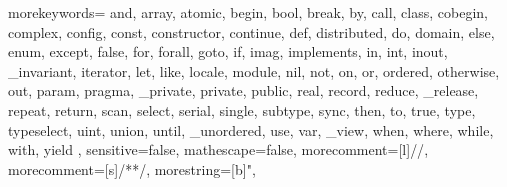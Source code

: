   {
    morekeywords={
      and, array, atomic,
      begin, bool, break, by,
      call, class, cobegin, complex, config, const, constructor, continue,
      def, distributed, do, domain,
      else, enum, except,
      false, for, forall,
      goto,
      if, imag, implements, in, int, inout, _invariant, iterator,
      let, like, locale,
      module,
      nil, not,
      on, or, ordered, otherwise, out,
      param, pragma, _private, private, public,
      real, record, reduce, _release, repeat, return,
      scan, select, serial, single, subtype, sync,
      then, to, true, type, typeselect,
      uint, union, until, _unordered, use,
      var, _view,
      when, where, while, with,
      yield
    },
    sensitive=false,
    mathescape=false,
    morecomment=[l]{//},
    morecomment=[s]{/*}{*/},
    morestring=[b]",
}

\lstset{
    basicstyle=\footnotesize\ttfamily,
    keywordstyle=\bfseries,
    commentstyle=\em,
    showstringspaces=false,
    flexiblecolumns=false,
    numbers=left,
    numbersep=5pt,
    numberstyle=\tiny,
    numberblanklines=false,
    stepnumber=0
  }

\newcommand{\chpl}[1]{\lstinline[language=chapel,basicstyle=\normalsize\ttfamily,keywordstyle=]!#1!}

